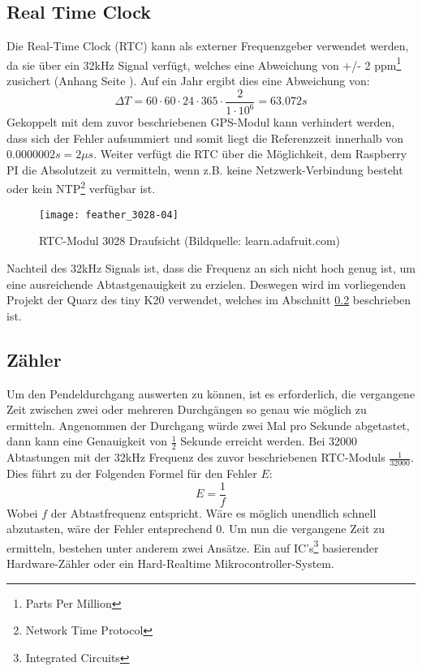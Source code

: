 \subsection{Real Time Clock}
\label{cap:RTC}
	Die Real-Time Clock (RTC) kann als externer Frequenzgeber verwendet werden, da sie über ein 32kHz Signal verfügt, welches eine Abweichung von +/- 2 ppm\footnote{Parts Per Million} zusichert (Anhang Seite \pageref{app:rtc_osc} ). Auf ein Jahr ergibt dies eine Abweichung von:
	\[
		\Delta{T} = 60 \cdot 60 \cdot 24 \cdot 365 \cdot \frac{2}{1\cdot 10^6} = 63.072s
	\]
	Gekoppelt mit dem zuvor beschriebenen GPS-Modul kann verhindert werden, dass sich der Fehler aufsummiert und somit liegt die Referenzzeit innerhalb von $0.0000002s = 2\mu{s}$. 
	Weiter verfügt die RTC über die Möglichkeit, dem Raspberry PI die Absolutzeit zu vermitteln, wenn z.B. keine Netzwerk-Verbindung besteht oder kein NTP\footnote{Network Time Protocol} verfügbar ist.
		\begin{figure}[H]
        	\centering
        	\texttt{[image: feather\_3028-04]}
        	\caption{RTC-Modul 3028 Draufsicht (Bildquelle: learn.adafruit.com)}
        	\label{fig:RTC3028}
    	\end{figure}
Nachteil des 32kHz Signals ist, dass die Frequenz an sich nicht hoch genug ist, um eine ausreichende Abtastgenauigkeit zu erzielen.
Deswegen wird im vorliegenden Projekt der Quarz des tiny K20 verwendet, welches im Abschnitt \ref{cap:counter} beschrieben ist.
%
%
\subsection{Zähler}
\label{cap:counter}
	Um den Pendeldurchgang auswerten zu können, ist es erforderlich, die vergangene Zeit zwischen zwei oder mehreren Durchgängen so genau wie möglich zu ermitteln. Angenommen der Durchgang würde zwei Mal pro Sekunde abgetastet, dann kann eine Genauigkeit von $\frac{1}{2}$ Sekunde erreicht werden. Bei 32000 Abtastungen mit der 32kHz Frequenz des zuvor beschriebenen RTC-Moduls $\frac{1}{32000}$. Dies führt zu der Folgenden Formel für den Fehler $E$:
	\[
		E = \frac{1}{f}
	\]
	Wobei $f$ der Abtastfrequenz entspricht. Wäre es möglich unendlich schnell abzutasten, wäre der Fehler entsprechend 0. Um nun die vergangene Zeit zu ermitteln, bestehen unter anderem zwei Ansätze. Ein auf IC's\footnote{Integrated Circuits} basierender Hardware-Zähler oder ein Hard-Realtime Mikrocontroller-System.

